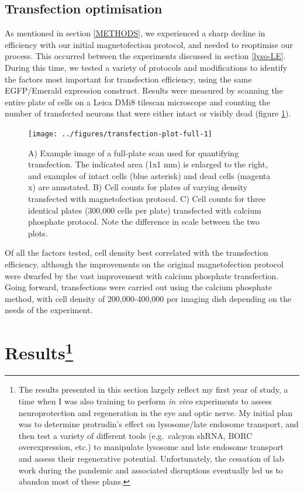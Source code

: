 \documentclass[
  12pt,
  a4paper,
]{book}
\begin{document}
\hypertarget{transfection-optimisation}{%
\subsection{Transfection optimisation}\label{transfection-optimisation}}

As mentioned in section \ref{METHODS}, we experienced a sharp decline in efficiency with our initial magnetofection protocol, and needed to reoptimise our process. This occurred between the experiments discussed in section \ref{lyso-LE}. During this time, we tested a variety of protocols and modifications to identify the factors most important for transfection efficiency, using the same EGFP/Emerald expression construct. Results were measured by scanning the entire plate of cells on a Leica DMi8 tilescan microscope and counting the number of transfected neurons that were either intact or visibly dead (figure \ref{fig:transfection-plot-full}).

\begin{figure}[!h]
\texttt{[image: ../figures/transfection-plot-full-1]} \caption[Transfection optimisation plot]{A) Example image of a full-plate scan used for quantifying transfection.  The indicated area (1x1 mm) is enlarged to the right, and examples of intact cells (blue asterisk) and dead cells (magenta x) are annotated. B) Cell counts for plates of varying density transfected with magnetofection protocol.  C) Cell counts for three identical plates (300,000 cells per plate) transfected with calcium phosphate protocol.  Note the difference in scale between the two plots.}\label{fig:transfection-plot-full}
\end{figure}

Of all the factors tested, cell density best correlated with the transfection efficiency, although the improvements on the original magnetofection protocol were dwarfed by the vast improvement with calcium phosphate transfection. Going forward, transfections were carried out using the calcium phosphate method, with cell density of 200,000-400,000 per imaging dish depending on the needs of the experiment.

\hypertarget{results}{%
\section[Results]{\texorpdfstring{Results\footnote{The results presented in this section largely reflect my first year of study, a time when I was also training to perform \emph{in vivo} experiments to assess neuroprotection and regeneration in the eye and optic nerve. My initial plan was to determine protrudin's effect on lysosome/late endosome transport, and then test a variety of different tools (e.g.~calcyon shRNA, BORC overexpression, etc.) to manipulate lysosome and late endosome transport and assess their regenerative potential. Unfortunately, the cessation of lab work during the pandemic and associated disruptions eventually led us to abandon most of these plans.}}{Results}}\label{results}}
\end{document}
